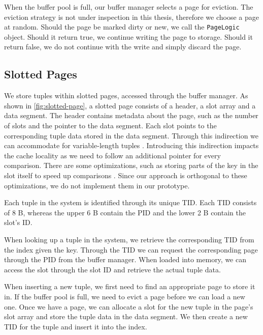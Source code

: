 When the buffer pool is full, our buffer manager selects a page for eviction. 
The eviction strategy is not under inspection in this thesis, therefore we choose a page at random.
Should the page be marked dirty or new, we call the \texttt{PageLogic} object.
Should it return true, we continue writing the page to storage.
Should it return false, we do not continue with the write and simply discard the page.

\subsection*{Slotted Pages}

We store tuples within slotted pages, accessed through the buffer manager.
As shown in \autoref{fig:slotted-page}, a slotted page consists of a header, a slot array and a data segment.
The header contains metadata about the page, such as the number of slots and the pointer to the data segment.
Each slot points to the corresponding tuple data stored in the data segment.
Through this indirection we can accommodate for variable-length tuples \cite{mdbs2024slides}.
Introducing this indirection impacts the cache locality as we need to follow an additional pointer for every comparison.
There are some optimizations, such as storing parts of the key in the slot itself to speed up comparisons \cite{graefe2014memory}.
Since our approach is orthogonal to these optimizations, we do not implement them in our prototype.

Each tuple in the system is identified through its unique \ac{TID}.
Each \ac{TID} consists of 8 B, whereas the upper 6 B contain the \ac{PID} and the lower 2 B contain the slot's ID.

When looking up a tuple in the system, we retrieve the corresponding \ac{TID} from the index given the key.
Through the \ac{TID} we can request the corresponding page through the \ac{PID} from the buffer manager.
When loaded into memory, we can access the slot through the slot ID and retrieve the actual tuple data.

When inserting a new tuple, we first need to find an appropriate page to store it in.
If the buffer pool is full, we need to evict a page before we can load a new one.
Once we have a page, we can allocate a slot for the new tuple in the page's slot array and store the tuple data in the data segment.
We then create a new \ac{TID} for the tuple and insert it into the index.

